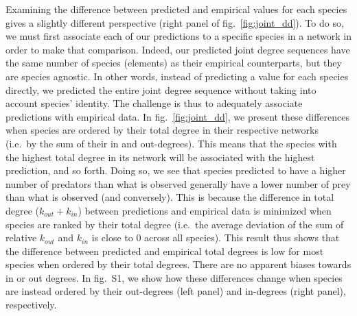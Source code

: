 \documentclass[10pt,oneside]{article}
\begin{document}
Examining the difference between predicted and empirical values for each
species gives a slightly different perspective (right panel of
fig.~\ref{fig:joint_dd}). To do so, we must first associate each of our
predictions to a specific species in a network in order to make that
comparison. Indeed, our predicted joint degree sequences have the same
number of species (elements) as their empirical counterparts, but they
are species agnostic. In other words, instead of predicting a value for
each species directly, we predicted the entire joint degree sequence
without taking into account species' identity. The challenge is thus to
adequately associate predictions with empirical data. In
fig.~\ref{fig:joint_dd}, we present these differences when species are
ordered by their total degree in their respective networks (i.e.~by the
sum of their in and out-degrees). This means that the species with the
highest total degree in its network will be associated with the highest
prediction, and so forth. Doing so, we see that species predicted to
have a higher number of predators than what is observed generally have a
lower number of prey than what is observed (and conversely). This is
because the difference in total degree (\(k_{out} + k_{in}\)) between
predictions and empirical data is minimized when species are ranked by
their total degree (i.e.~the average deviation of the sum of relative
\(k_{out}\) and \(k_{in}\) is close to \(0\) across all species). This
result thus shows that the difference between predicted and empirical
total degrees is low for most species when ordered by their total
degrees. There are no apparent biases towards in or out degrees. In
fig.~S1, we show how these differences change when species are instead
ordered by their out-degrees (left panel) and in-degrees (right panel),
respectively.
\end{document}
